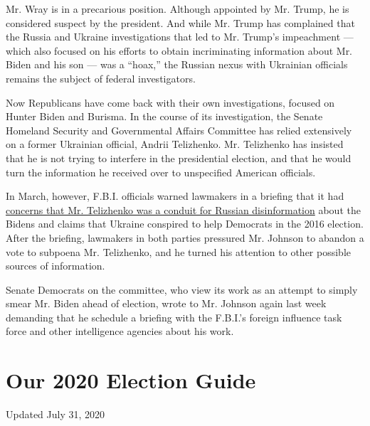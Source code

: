 Mr. Wray is in a precarious position. Although appointed by Mr. Trump,
he is considered suspect by the president. And while Mr. Trump has
complained that the Russia and Ukraine investigations that led to Mr.
Trump's impeachment --- which also focused on his efforts to obtain
incriminating information about Mr. Biden and his son --- was a
``hoax,'' the Russian nexus with Ukrainian officials remains the subject
of federal investigators.

Now Republicans have come back with their own investigations, focused on
Hunter Biden and Burisma. In the course of its investigation, the Senate
Homeland Security and Governmental Affairs Committee has relied
extensively on a former Ukrainian official, Andrii Telizhenko. Mr.
Telizhenko has insisted that he is not trying to interfere in the
presidential election, and that he would turn the information he
received over to unspecified American officials.

In March, however, F.B.I. officials warned lawmakers in a briefing that
it had
\href{https://www.nytimes.com/2020/03/11/us/politics/senate-subpoena-ron-johnson-ukraine.html}{concerns
that Mr. Telizhenko was a conduit for Russian disinformation} about the
Bidens and claims that Ukraine conspired to help Democrats in the 2016
election. After the briefing, lawmakers in both parties pressured Mr.
Johnson to abandon a vote to subpoena Mr. Telizhenko, and he turned his
attention to other possible sources of information.

Senate Democrats on the committee, who view its work as an attempt to
simply smear Mr. Biden ahead of election, wrote to Mr. Johnson again
last week demanding that he schedule a briefing with the F.B.I.'s
foreign influence task force and other intelligence agencies about his
work.

\hypertarget{our-2020-election-guide}{%
\section{Our 2020 Election Guide}\label{our-2020-election-guide}}

Updated July 31, 2020

